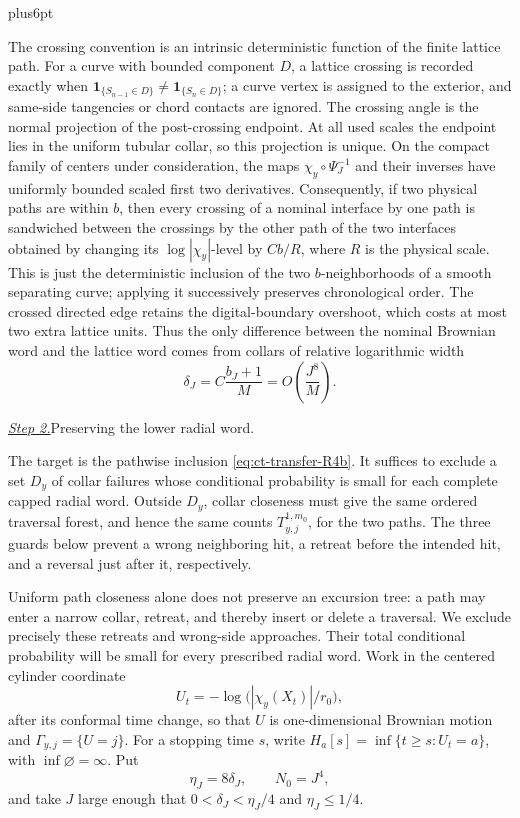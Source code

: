 \documentclass[12pt,reqno]{amsart}
\makeatletter
\theoremstyle{plain}
\theoremstyle{definition}
\theoremstyle{remark}
\renewenvironment{proof}[1][\proofname]{%
  \par
  \pushQED{\qed}%
  \normalfont
  \topsep6pt plus6pt\relax
  \trivlist
  \item[\hskip\labelsep\slshape #1\@addpunct{.}]%
  \ignorespaces
}{%
  \popQED
  \endtrivlist
  \@endpefalse
}
\DeclareRobustCommand{\qed}{%
  \leavevmode\unskip\penalty9999\hbox{}\nobreak
  \ifmmode
    \makebox[0pt][l]{\qquad\hbox{\qedsymbol}}%
  \else
    \qquad\hbox{\qedsymbol}%
  \fi
}
\renewcommand{\qedsymbol}{\rule[.47pt]{4pt}{6pt}}
\numberwithin{equation}{section}
\makeatother
\begin{document}
\begin{proof}[Proof of Lemma~\ref{lem:buffered-transfer}]
The crossing convention is an intrinsic deterministic function of the
finite lattice path.  For a curve with bounded component $D$, a lattice
crossing is recorded exactly when
$\mathbf1_{\{S_{n-1}\in D\}}\ne\mathbf1_{\{S_n\in D\}}$; a curve vertex
is assigned to the exterior, and same-side tangencies or chord contacts are
ignored.  The crossing angle is the normal projection of the post-crossing
endpoint.  At all used scales the endpoint lies in the uniform tubular
collar, so this projection is unique.  On the compact family of
centers under consideration, the maps $\chi_y\circ\Psi_J^{-1}$ and
their inverses have uniformly bounded scaled first two derivatives.
Consequently, if two physical paths are within $b$, then every
crossing of a nominal interface by one path is sandwiched between the
crossings by the other path of the two interfaces obtained by changing
its $\log|\chi_y|$-level by $Cb/R$, where $R$ is the physical
scale.  This is just the deterministic inclusion of the two
$b$-neighborhoods of a smooth separating curve; applying it
successively preserves chronological order.
The crossed directed edge retains the digital-boundary overshoot, which
costs at most two extra lattice units.  Thus
the only difference between the nominal Brownian word and the lattice
word comes from collars of relative logarithmic width
\begin{equation}
\delta_J=C\frac{b_J+1}{M}=O\left(\frac{J^8}{M}\right).\label{eq:ct-transfer-33}
\end{equation}

\smallskip\noindent
\underline{\textit{Step 2.}}\quad Preserving the lower radial word.

The target is the pathwise inclusion \eqref{eq:ct-transfer-R4b}.
It suffices to exclude a set $D_y$ of collar failures whose conditional
probability is small for each complete capped radial word. Outside $D_y$,
collar closeness must give the same ordered traversal forest, and hence the
same counts $T_{y,j}^{1,m_0}$, for the two paths. The three guards below
prevent a wrong neighboring hit, a retreat before the intended hit, and a
reversal just after it, respectively.

Uniform path closeness alone does not preserve an excursion tree: a path
may enter a narrow collar, retreat, and thereby insert or delete a traversal.
We exclude precisely these retreats and wrong-side approaches.  Their total
conditional probability will be small for every prescribed radial word.  Work in the centered cylinder coordinate
\[
U_t=-\log\bigl(|\chi_y(X_t)|/r_0\bigr),
\]
after its conformal time change, so that $U$ is one-dimensional Brownian
motion and $\Gamma_{y,j}=\{U=j\}$.  For a stopping time $s$, write
$H_a[s]=\inf\{t\ge s:U_t=a\}$, with $\inf\varnothing=\infty$.  Put
\begin{equation}
\eta_J=8\delta_J,\qquad N_0=J^4,\label{eq:ct-transfer-R1}
\end{equation}
and take $J$ large enough that $0<\delta_J<\eta_J/4$ and
$\eta_J\le1/4$.


\end{proof}
\end{document}
